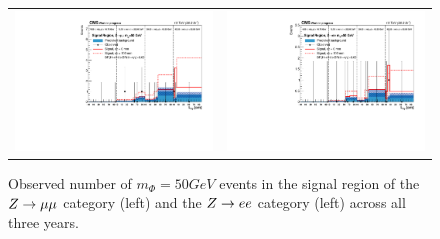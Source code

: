 \begin{figure}[htb!]
\begin{tabular}{c c}
		\includegraphics[width=0.45\linewidth]{figs/05_analysis/closure_ZH_MU_m50_data_2016.pdf} &
		\includegraphics[width=0.45\linewidth]{figs/05_analysis/closure_ZH_ELE_m50_data_2016.pdf} \\
	\end{tabular}
	\caption[Observed number of $m_\Phi=50\unit{GeV}$ events in the signal region of the $\VZ\to\mu\mu$ category (left) and the $\VZ\to ee$ category (left) across all three years.]{Observed number of $m_\Phi=50\unit{GeV}$ events in the signal region of the $\VZ\to\mu\mu$ category (left) and the $\VZ\to ee$ category (left) across all three years.}
	\label{fig:results_m50}
\end{figure}

